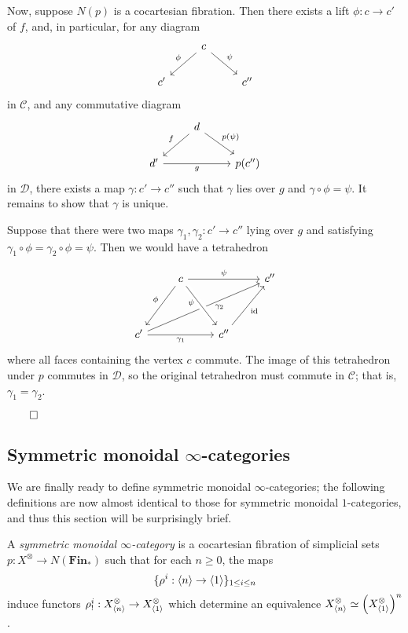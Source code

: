 \documentclass{MetricNotes2023}
\def\id{\ensuremath\text{id}}
\def\done{\begin{flushright}\vspace{-4.35ex}\(\qed\)\end{flushright}}
\begin{document}
\begin{ourproof}
Now, suppose \(N(p)\) is a cocartesian fibration. Then there exists a lift \(\phi : c \to c'\) of \(f\), and, in particular, for any diagram
\[\begin{tikzcd}
& c \arrow[dl, swap, "\phi"] \arrow[dr, "\psi"]  & \\
c'  & & c''
\end{tikzcd}\]
in \(\mathcal{C}\), and any commutative diagram
\[\begin{tikzcd}
& d \arrow[dl, swap, "f"] \arrow[dr, "p(\psi)"]  & \\
d' \arrow[rr, swap, "g"] & & p(c'')
\end{tikzcd}\]
in \(\mathcal{D}\), there exists a map \(\gamma : c'\to c''\) such that \(\gamma\) lies over \(g\) and \(\gamma \circ \phi = \psi\). It remains to show that \(\gamma\) is unique. 

Suppose that there were two maps \(\gamma_1, \gamma_2 : c' \to c''\) lying over \(g\) and satisfying \(\gamma_1\circ\phi = \gamma_2 \circ \phi = \psi\). Then we would have a tetrahedron 

\[\begin{tikzcd}
& c \arrow[rr, "\psi"] \arrow[ddl, swap, "\phi"]  & & c'' \\
& & & \\
c' \arrow[rr, swap, "\gamma_1"] \arrow[rrruu, swap, "\gamma_2" {xshift=8pt, yshift=5pt}] & & c'' \arrow[ruu, swap, "\id"] \arrow[from=luu, swap, crossing over, "\psi" {xshift=-4pt, yshift=8pt}] & 
\end{tikzcd}\]
where all faces containing the vertex \(c\) commute. The image of this tetrahedron under \(p\) commutes in \(\mathcal{D}\), so the original tetrahedron must commute in \(\mathcal{C}\); that is, \(\gamma_1=\gamma_2\).\done
\end{ourproof}

\subsection{Symmetric monoidal \(\infty\)-categories}

We are finally ready to define symmetric monoidal \(\infty\)-categories; the following definitions are now almost identical to those for symmetric monoidal \(1\)-categories, and thus this section will be surprisingly brief.

\begin{definition}
A \textit{symmetric monoidal \(\infty\)-category} is a cocartesian fibration of simplicial sets \(p : X^\otimes \to N(\textbf{Fin}_*)\) such that for each \(n \geq 0\), the maps 
\[\{\rho^i : \langle n\rangle\to \langle1\rangle\}_{1 \leq i \leq n}\] 
induce functors \(\rho^i_! : X^\otimes_{\langle n\rangle}\to X^\otimes_{\langle1\rangle}\) which determine an equivalence \(X^\otimes_{\langle n\rangle}\simeq \left(X^\otimes_{\langle1\rangle}\right)^n\). 
\end{definition}
\end{document}
